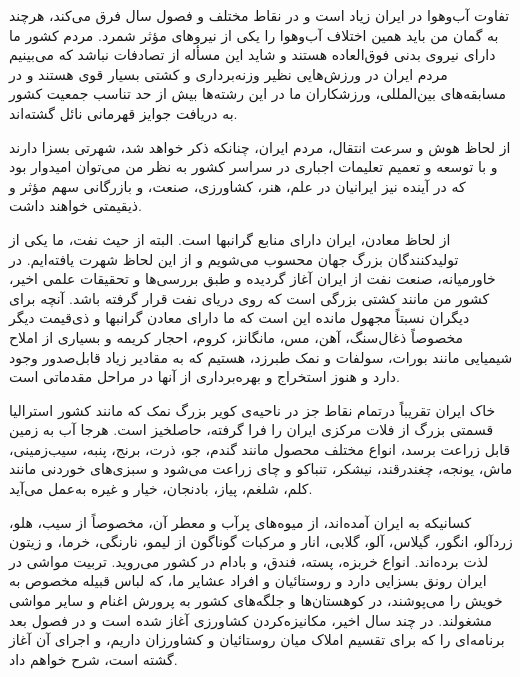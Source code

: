 \par
تفاوت آب‌و‌هوا در ایران زیاد است و در نقاط مختلف و فصول سال فرق می‌کند، هرچند به گمان من باید همین اختلاف آب‌و‌هوا را یکی از نیروهای مؤثر شمرد.
مردم کشور ما دارای نیروی بدنی فوق‌العاده هستند و شاید این مسأله از تصادفات نباشد که می‌بینیم مردم ایران در ورزش‌هایی نظیر وزنه‌برداری و کشتی بسیار قوی هستند و در مسابقه‌های بین‌المللی، ورزشکاران ما در این رشته‌ها بیش از حد تناسب جمعیت کشور به دریافت جوایز قهرمانی نائل گشته‌اند.
\par
از لحاظ هوش و سرعت انتقال، مردم ایران، چنانکه ذکر خواهد شد، شهرتی بسزا دارند و با توسعه و تعمیم تعلیمات اجباری در سراسر کشور به نظر من می‌توان امیدوار بود که در آینده نیز ایرانیان در علم، هنر، کشاورزی، صنعت، و بازرگانی سهم مؤثر و ذیقیمتی خواهند داشت.
\par
از لحاظ معادن، ایران دارای منابع گرانبها است. البته از حیث نفت، ما یکی از تولیدکنندگان بزرگ جهان محسوب می‌شویم  و از این لحاظ شهرت یافته‌ایم. در خاورمیانه، صنعت نفت از ایران آغاز گردیده و طبق بررسی‌ها و تحقیقات علمی اخیر، کشور من مانند کشتی بزرگی است که روی دریای نفت قرار گرفته باشد.
آنچه برای دیگران نسبتاً مجهول مانده این است که ما دارای معادن گرانبها و ذی‌قیمت دیگر مخصوصاً ذغال‌سنگ، آهن، مس، مانگانز، کروم، احجار کریمه و بسیاری از املاح شیمیایی مانند بورات، سولفات و نمک طبرزد، هستیم که به مقادیر زیاد قابل‌صدور وجود دارد و هنوز استخراج و بهره‌برداری از آنها در مراحل مقدماتی است.  
\par
خاک ایران تقریباً درتمام نقاط جز در ناحیه‌ی کویر بزرگ نمک که مانند کشور استرالیا قسمتی بزرگ از فلات مرکزی ایران را فرا گرفته، حاصلخیز است.
هرجا آب به زمین قابل زراعت برسد، انواع مختلف محصول مانند گندم، جو، ذرت، برنج، پنبه، سیب‌زمینی، ماش، یونجه، چغندرقند، نیشکر، تنباکو  و چای زراعت می‌شود و سبزی‌های خوردنی مانند کلم، شلغم، پیاز، بادنجان، خیار و غیره به‌عمل می‌آید.  
\par
کسانیکه به ایران آمده‌اند، از میوه‌های پرآب و معطر آن، مخصوصاً از سیب، هلو، زردآلو، انگور، گیلاس، آلو، گلابی، انار و مرکبات گوناگون از لیمو، نارنگی، خرما، و زیتون لذت برده‌اند. انواع خربزه، پسته، فندق، و بادام در کشور می‌روید. تربیت مواشی در ایران رونق بسزایی دارد و روستائیان و افراد عشایر ما، که لباس قبیله مخصوص به خویش را می‌پوشند، در کوهستان‌ها و جلگه‌های کشور به پرورش اغنام و سایر مواشی مشغولند. 
در چند سال اخیر، مکانیزه‌کردن کشاورزی آغاز شده است و در فصول بعد برنامه‌ای را که برای تقسیم املاک میان روستائیان و کشاورزان داریم، و اجرای آن آغاز گشته است، شرح خواهم داد. 
